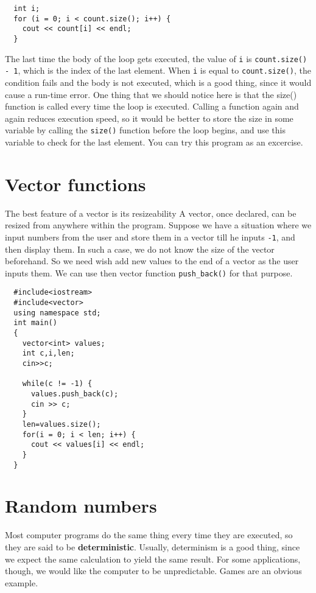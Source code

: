 \begin{verbatim}
  int i;
  for (i = 0; i < count.size(); i++) {
    cout << count[i] << endl;
  }
\end{verbatim}
%
The last time the body of the loop gets executed, the value of {\tt i}
is {\tt count.size() - 1}, which is the index of the last element.  When
{\tt i} is equal to {\tt count.size()}, the condition fails and the body
is not executed, which is a good thing, since it would cause a
run-time error. One thing that we should notice here is that the
size() function is called every time the loop is executed. Calling
a function again and again reduces execution speed, so it would be better
to store the size in some variable by calling the {\tt size()} function
before the loop begins, and use this variable to check for the last element.
You can try this program as an excercise.

\section{Vector functions}

The best feature of a vector is its resizeability A vector, once declared,
can be resized from anywhere within the program. Suppose we have a situation
where we input numbers from the user and store them in a vector till he
inputs {\tt -1}, and then display them. In such a case, we do not know the size of the
vector beforehand. So we need wish add new values to the end of
a vector as the user inputs them. We can use then vector
function {\tt push\_back()} for that purpose.

\begin{verbatim}
  #include<iostream>
  #include<vector>
  using namespace std;
  int main()
  {
    vector<int> values;
    int c,i,len;
    cin>>c;
    
    while(c != -1) {
      values.push_back(c);
      cin >> c;
    }
    len=values.size();
    for(i = 0; i < len; i++) {
      cout << values[i] << endl;
    }
  }

\end{verbatim}

\section{Random numbers}
\label{random}
\label{pseudorandom}

Most computer programs do the same thing every time they are executed,
so they are said to be {\bf deterministic}.  Usually, determinism is a
good thing, since we expect the same calculation to yield the same
result.  For some applications, though, we would like the
computer to be unpredictable.  Games are an obvious example.

